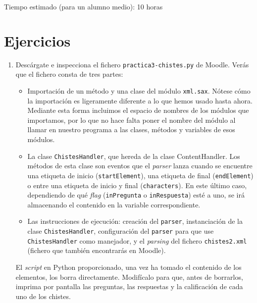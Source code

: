 \documentclass[11pt,a4paper]{article}
\begin{document}
Tiempo estimado (para un alumno medio): 10 horas

\section{Ejercicios}

\begin{enumerate}

  \item Descárgate e inspecciona el fichero \texttt{practica3-chistes.py} de Moodle. Verás que el fichero consta de tres partes:
  \begin{itemize}
    \item Importación de un método y una clase del módulo \texttt{xml.sax}. Nótese cómo la importación es ligeramente diferente a lo que hemos usado hasta ahora. Mediante esta forma incluimos el espacio de nombres de los módulos que importamos, por lo que no hace falta poner el nombre del módulo al llamar en nuestro programa a las clases, métodos y variables de esos módulos.
    \item La clase \texttt{ChistesHandler}, que hereda de la clase ContentHandler. Los métodos de esta clase son eventos que el \emph{parser} lanza cuando se encuentre una etiqueta de inicio (\texttt{startElement}), una etiqueta de final (\texttt{endElement}) o entre una etiqueta de inicio y final (\texttt{characters}). En este último caso, dependiendo de qué \emph{flag} (\texttt{inPregunta} o \texttt{inRespuesta}) esté a uno, se irá almacenando el contenido en la variable correspondiente.
    \item Las instrucciones de ejecución: creación del \texttt{parser}, instanciación de la clase \texttt{ChistesHandler}, configuración del \texttt{parser} para que use \texttt{ChistesHandler} como manejador, y el \emph{parsing} del fichero \texttt{chistes2.xml} (fichero que también encontrarás en Moodle).
  \end{itemize}

El \emph{script} en Python proporcionado, una vez ha tomado el contenido de los elementos, los borra directamente. Modifícalo para que, antes de borrarlos, imprima por pantalla las preguntas, las respuestas y la calificación de cada uno de los chistes.

  \begin{footnotesize}
  \end{footnotesize}



\end{enumerate}
\end{document}
